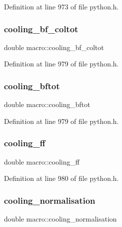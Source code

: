 Definition at line 973 of file python.\+h.

\mbox{\label{structmacro_a6980807d807f7e9e1a49c195e09ce70a}} 
\subsubsection{\texorpdfstring{cooling\+\_\+bf\+\_\+coltot}{cooling\_bf\_coltot}}
{\footnotesize\ttfamily double macro\+::cooling\+\_\+bf\+\_\+coltot}



Definition at line 979 of file python.\+h.

\mbox{\label{structmacro_ab0671cf0f286d0fc484da2b0894df5bf}} 
\subsubsection{\texorpdfstring{cooling\+\_\+bftot}{cooling\_bftot}}
{\footnotesize\ttfamily double macro\+::cooling\+\_\+bftot}



Definition at line 979 of file python.\+h.

\mbox{\label{structmacro_a8427be6ddfa589b733a30ab12e26daf0}} 
\subsubsection{\texorpdfstring{cooling\+\_\+ff}{cooling\_ff}}
{\footnotesize\ttfamily double macro\+::cooling\+\_\+ff}



Definition at line 980 of file python.\+h.

\mbox{\label{structmacro_aa7af4ae4af78ef3c646d7e776275b584}} 
\subsubsection{\texorpdfstring{cooling\+\_\+normalisation}{cooling\_normalisation}}
{\footnotesize\ttfamily double macro\+::cooling\+\_\+normalisation}




